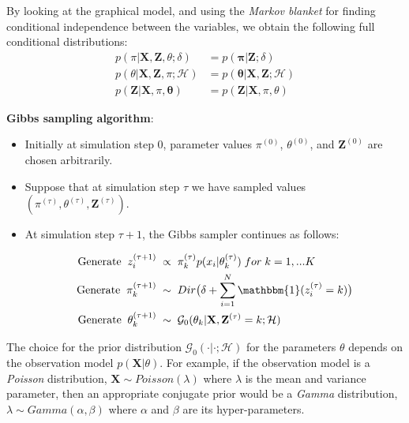 By looking at the graphical model, and using the \emph{Markov blanket} for finding conditional independence between the variables, we obtain the following full conditional distributions:
\begin{equation}%
  \begin{aligned}
	p(\pi|\mathbf{X},\mathbf{Z},\theta;\delta) & = p(\mathbf{\pi} | \mathbf{Z};\delta) \\ 
	p(\theta|\mathbf{X},\mathbf{Z},\pi;\mathcal{H}) & = p(\mathbf{\theta}|\mathbf{X},\mathbf{Z};\mathcal{H})  \\
	p(\mathbf{Z}|\mathbf{X},\pi, \mathbf{\theta}) & = p(\mathbf{Z}|\mathbf{X},\pi, \theta)
  \end{aligned}
\end{equation}

\noindent\textbf{Gibbs sampling algorithm}: 
\begin{itemize}
\item {Initially at simulation step 0, parameter values $\pi^{(0)}$, $\theta^{(0)}$, and $\mathbf{Z}^{(0)}$ are chosen arbitrarily.}
\item {Suppose that at simulation step $\tau$ we have sampled values $(\pi^{(\tau)}, \theta^{(\tau)}, \mathbf{Z}^{(\tau)})$.}
\item { At simulation step $\tau + 1$, the Gibbs sampler continues as follows:

\begin{equation}%
  \begin{aligned}
    \text{Generate} \; \; z_{i}^{(\tau+1)} \; & \propto \; \pi_{k}^{(\tau)}p(x_{i}|\theta_{k}^{(\tau)}) \; for \; k=1,...K \\
    \text{Generate} \; \; \pi_{k}^{(\tau+1)} \; & \sim \; Dir\big(\delta + \sum_{i=1}^{N}\mathbbm{1}(z_{i}^{(\tau)}=k)\big) \\
    \text{Generate} \; \; \theta_{k}^{(\tau+1)} \; & \sim \; \mathcal{G}_{0}(\theta_{k}| \mathbf{X}, \mathbf{Z}^{(\tau)}=k; \mathcal{H})
  \end{aligned}
\end{equation}
}
\end{itemize}

The choice for the prior distribution $\mathcal{G}_{0}(\cdot| \cdot; \mathcal{H})$ for the parameters $\theta$ depends on the observation model $p(\mathbf{X}|\theta)$. For example, if the observation model is a \emph{Poisson} distribution, \ie $\mathbf{X} \sim Poisson(\lambda)$ where $\lambda$ is the mean and variance parameter, then an appropriate conjugate prior would be a \emph{Gamma} distribution, \ie $\lambda \sim Gamma(\alpha, \beta)$ where $\alpha$ and $\beta$ are its hyper-parameters.
